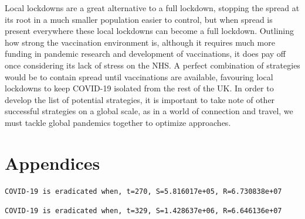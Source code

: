 \documentclass[11pt]{article}
\begin{document}
Local lockdowns are a great alternative to a full lockdown, stopping the spread at its root in a much smaller population easier to control, but when spread is present everywhere these local lockdowns can become a full lockdown. Outlining how strong the vaccination environment is, although it requires much more funding in pandemic research and development of vaccinations, it does pay off once considering its lack of stress on the NHS. A perfect combination of strategies would be to contain spread until vaccinations are available, favouring local lockdowns to keep COVID-19 isolated from the rest of the UK. In order to develop the list of potential strategies, it is important to take note of other successful strategies on a global scale, as in a world of connection and travel, we must tackle global pandemics together to optimize approaches.
\newpage


\section{Appendices}



\begin{verbatim}
COVID-19 is eradicated when, t=270, S=5.816017e+05, R=6.730838e+07
\end{verbatim}




\begin{verbatim}
COVID-19 is eradicated when, t=329, S=1.428637e+06, R=6.646136e+07
\end{verbatim}
\end{document}
